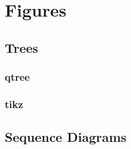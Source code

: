 \documentclass[a4paper, 12pt]{report}
\begin{document}
    \chapter{Figures}

    \section{Trees}

    \subsection{qtree}
    
    \newpage

    \subsection{tikz}
    
    \newpage

    \section{Sequence Diagrams}
    
    \newpage

    \printbibliography
    
\end{document}
